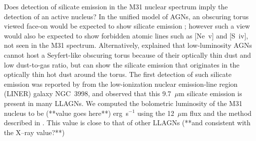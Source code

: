 Does detection of silicate emission in the M31 nuclear spectrum imply the detection of an active nucleus?
In the unified model of AGNs, an obscuring torus viewed face-on would be expected to show silicate emission
\citep{AGNtypes1995, AGNref}; however such a view would also be expected to show forbidden atomic lines such as [Ne~{\sc v}] and [S~{\sc iv}],
not seen in the M31 spectrum. Alternatively, \citet{Mason2012} explained that low-luminosity AGNs cannot 
host a Seyfert-like obscuring torus because of their optically thin dust and low dust-to-gas ratio, but can show
the silicate emission that originates in the optically thin hot dust around the torus.  The first detection of such silicate emission was 
reported by \citet{Sturm2005} from the low-ionization nuclear emission-line region (LINER) galaxy NGC~3998, and 
\citealt{Mason2012}  observed that this 9.7~$\mu$m silicate emission is present in many LLAGNs. 
We computed the bolometric luminosity of the M31 nucleus  to be (**value goes here**) erg~s$^{-1}$ using the 12~$\mu$m flux 
and the method described in \citet{luminosity}. This value is close to that of other LLAGNs (**and consistent with the X--ray value?**)
